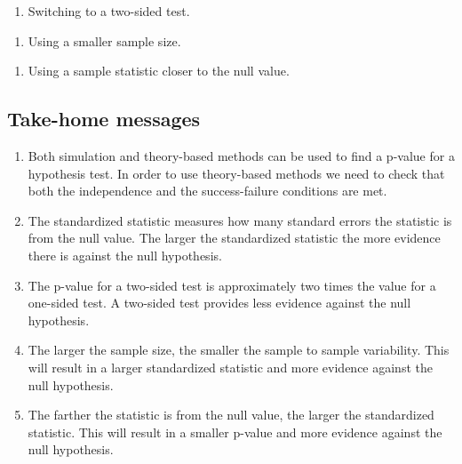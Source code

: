 \documentclass[
]{report}
\providecommand{\tightlist}{%
  \setlength{\itemsep}{0pt}\setlength{\parskip}{0pt}}
\begin{document}
\begin{enumerate}
\def\labelenumi{\alph{enumi})}
\tightlist
\item
  Switching to a two-sided test.
\end{enumerate}

\vspace{0.4in}

\begin{enumerate}
\def\labelenumi{\alph{enumi})}
\setcounter{enumi}{1}
\tightlist
\item
  Using a smaller sample size.
\end{enumerate}

\vspace{0.4in}

\begin{enumerate}
\def\labelenumi{\alph{enumi})}
\setcounter{enumi}{2}
\tightlist
\item
  Using a sample statistic closer to the null value.
\end{enumerate}

\vspace{0.4in}

\hypertarget{take-home-messages-11}{%
\subsection{Take-home messages}\label{take-home-messages-11}}

\begin{enumerate}
\def\labelenumi{\arabic{enumi}.}
\item
  Both simulation and theory-based methods can be used to find a p-value for a hypothesis test. In order to use theory-based methods we need to check that both the independence and the success-failure conditions are met.
\item
  The standardized statistic measures how many standard errors the statistic is from the null value. The larger the standardized statistic the more evidence there is against the null hypothesis.
\item
  The p-value for a two-sided test is approximately two times the value for a one-sided test. A two-sided test provides less evidence against the null hypothesis.
\item
  The larger the sample size, the smaller the sample to sample variability. This will result in a larger standardized statistic and more evidence against the null hypothesis.
\item
  The farther the statistic is from the null value, the larger the standardized statistic. This will result in a smaller p-value and more evidence against the null hypothesis.
\end{enumerate}
\end{document}
